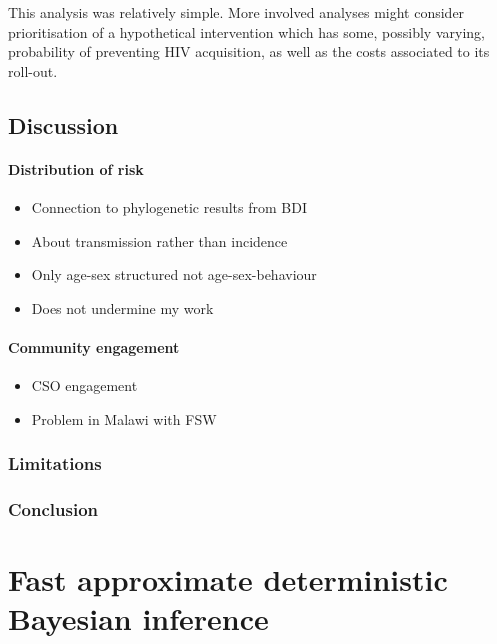 \documentclass[a4paper, nobind]{templates/ociamthesis}
\providecommand{\tightlist}{%
  \setlength{\itemsep}{0pt}\setlength{\parskip}{0pt}}
\begin{document}
This analysis was relatively simple.
More involved analyses might consider prioritisation of a hypothetical intervention which has some, possibly varying, probability of preventing HIV acquisition, as well as the costs associated to its roll-out.

\hypertarget{discussion-1}{%
\section{Discussion}\label{discussion-1}}

\hypertarget{distribution-of-risk}{%
\subsubsection{Distribution of risk}\label{distribution-of-risk}}

\begin{itemize}
\tightlist
\item
  Connection to phylogenetic results from BDI
\item
  About transmission rather than incidence
\item
  Only age-sex structured not age-sex-behaviour
\item
  Does not undermine my work
\end{itemize}

\hypertarget{community-engagement}{%
\subsubsection{Community engagement}\label{community-engagement}}

\begin{itemize}
\tightlist
\item
  CSO engagement
\item
  Problem in Malawi with FSW
\end{itemize}

\hypertarget{limitations-1}{%
\subsection{Limitations}\label{limitations-1}}

\hypertarget{conclusion-1}{%
\subsection{Conclusion}\label{conclusion-1}}

\hypertarget{naomi-aghq}{%
\chapter{Fast approximate deterministic Bayesian inference}\label{naomi-aghq}}
\end{document}
